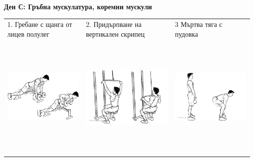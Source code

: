 \documentclass{article}
\begin{document}
\newpage
\textbf{Ден С: Гръбна мускулатура, коремни мускули}\\
\begin{tabular}{ | m{5cm} | m{5cm} | m{5cm} | }
\hline
1. Гребане с щанга от лицев полулег& 
2. Придърпване на вертикален скрипец   & 
3  Мъртва тяга с пудовка\\ 
\begin{minipage}{5cm} \includegraphics[width=\linewidth, height=60mm]{Dumbbell_Incline_Row.png} \end{minipage}&
\begin{minipage}{5cm} \includegraphics[width=\linewidth, height=60mm]{Wide-Grip_Lat_Pulldown.png} \end{minipage}& 
\begin{minipage}{5cm} \includegraphics[width=\linewidth, height=60mm]{Kettlebell_Deadlifts.png} \end{minipage} \\ 

\end{tabular}
\end{document}
